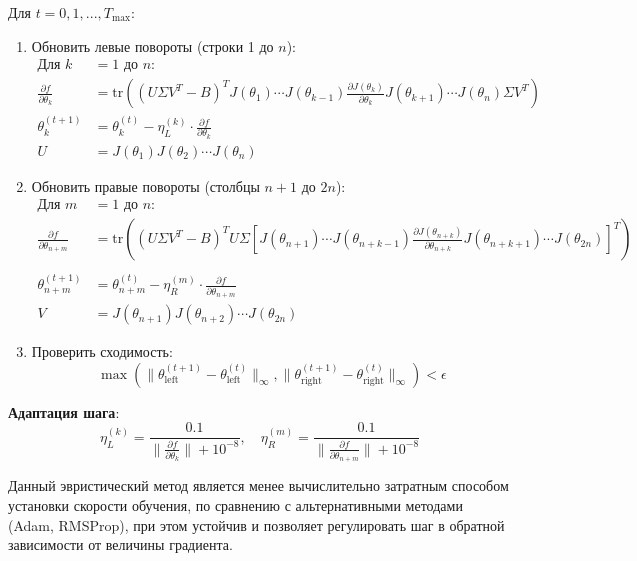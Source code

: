 Для $t = 0,1,...,T_{\text{max}}$:
\begin{enumerate}
 \item Обновить левые повороты (строки 1 до $n$):
 \begin{align*}
 \text{Для } k &= 1 \text{ до } n: \\
    \frac{\partial f}{\partial \theta_k} &= 
 \text{tr}\left((U\Sigma V^T - B)^TJ(\theta_1) \cdots  J(\theta_{k-1})\frac{\partial J(\theta_k)}{\partial \theta_k}J(\theta_{k+1}) \cdots J(\theta_n)\Sigma V^T\right) \\
 \theta_k^{(t+1)} &= \theta_k^{(t)} - \eta_L^{(k)} \cdot \frac{\partial f}{\partial \theta_k} \\
 U &= J(\theta_1)J(\theta_2)\cdots J(\theta_n)
 \end{align*}

 \item Обновить правые повороты (столбцы $n+1$ до $2n$):
 \begin{align*}
 \text{Для } m &= 1 \text{ до } n: \\
 \frac{\partial f}{\partial \theta_{n+m}} &= \text{tr}\left((U\Sigma V^T - B)^TU\Sigma \left[J(\theta_{n+1}) \cdots  J(\theta_{n+k-1})\frac{\partial J(\theta_{n+k})}{\partial \theta_{n+k}}J(\theta_{n+k+1}) \cdots J(\theta_{2n})\right]^T\right) \\ \\
 \theta_{n+m}^{(t+1)} &= \theta_{n+m}^{(t)} - \eta_R^{(m)} \cdot \frac{\partial f}{\partial \theta_{n+m}}\\
 V &= J(\theta_{n+1})J(\theta_{n+2})\cdots J(\theta_{2n})
 \end{align*}

 \item Проверить сходимость:
 \begin{equation}
 \max\left( \|\theta_{\text{left}}^{(t+1)} - \theta_{\text{left}}^{(t)}\|_\infty, \|\theta_{\text{right}}^{(t+1)} - \theta_{\text{right}}^{(t)}\|_\infty \right) < \epsilon
 \end{equation}
\end{enumerate}

\textbf{Адаптация шага}:
\begin{equation}
\eta_L^{(k)} = \frac{0.1}{\|\frac{\partial f}{\partial \theta_k}\| + 10^{-8}}, \quad \eta_R^{(m)} = \frac{0.1}{\|\frac{\partial f}{\partial \theta_{n+m}}\| + 10^{-8}}
\end{equation}

Данный эвристический метод является менее вычислительно затратным способом установки скорости обучения, по сравнению с альтернативными методами (Adam, RMSProp), при этом устойчив и позволяет регулировать шаг в обратной зависимости от величины градиента.

